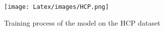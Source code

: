 \begin{figure}[htbp]
\centering
\texttt{[image: Latex/images/HCP.png]}
\caption{Training process of the model on the HCP dataset}
\label{fig:HCP_training}
\end{figure}